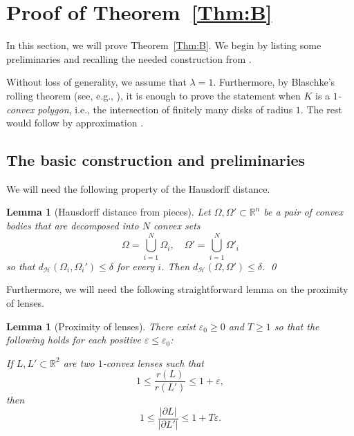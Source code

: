 \documentclass[11pt, oneside]{amsart}
\newcommand{\R}{\mathbb{R}}
\newcommand{\dH}{d_{\mathcal H}}
\newcommand{\eps}{\varepsilon}
\renewcommand{\ge}{\geqslant}
\renewcommand{\le}{\leqslant}
\theoremstyle{theorem}
\newtheorem{lemma}[theorem]{Lemma}
\theoremstyle{Intro}
\theoremstyle{definition}
\theoremstyle{remark}
\theoremstyle{claim}
\numberwithin{equation}{section}
\begin{document}
\section{Proof of Theorem~\ref{Thm:B}}
\label{Sec:ProofB}

In this section, we will prove Theorem~\ref{Thm:B}. We begin by listing some preliminaries and recalling the needed construction from \cite{DrTa}.

Without loss of generality, we assume that $\lambda=1$. Furthermore, by Blaschke's rolling theorem (see, e.g., \cite{DrTa}), it is enough to prove the statement when $K$ is a \emph{$1$-convex polygon}, i.e., the intersection of finitely many disks of radius $1$. The rest would follow by approximation \cite[Proposition 2.5]{DrTa}. 

\subsection{The basic construction and preliminaries}\label{Subsect:basic}

We will need the following property of the Hausdorff distance.

\begin{lemma}[Hausdorff distance from pieces]
\label{Lem:HPieces}
Let $\Omega, \Omega' \subset \R^n$ be a pair of convex bodies that are decomposed into $N$ convex sets
\[
\Omega = \bigcup_{i = 1}^N \Omega_i, \quad \Omega' = \bigcup_{i = 1}^N \Omega'_i
\]
so that $\dH(\Omega_i, \Omega_i') \le \delta$ for every $i$. Then $\dH(\Omega, \Omega') \le \delta$. \qed
\end{lemma}

Furthermore, we will need the following straightforward lemma on the proximity of lenses.

\begin{lemma}[Proximity of lenses]
\label{Lem:Proximity}
There exist $\eps_0 \ge 0$ and $T \ge 1$ so that the following holds for each positive $\eps \le \eps_0$: 

If $L, L' \subset \R^2$ are two $1$-convex lenses such that 
\[
1 \le \frac{r(L)}{r(L')} \le 1 + \eps,
\]
then 
\[
1 \le \frac{|\partial L|}{|\partial L'|} \le 1 + T \eps.
\]
\end{lemma}
\end{document}
